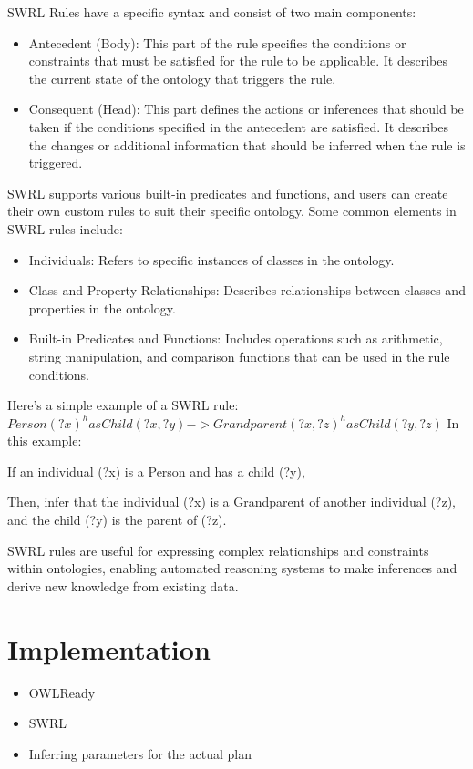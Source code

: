 \documentclass[	pdftex, 
								a4paper,
								11pt, DIV11, BCOR5mm,
								parskip,
								]{scrreprt}
\begin{document}
	SWRL Rules have a specific syntax and consist of two main components:
	\begin{itemize}
		\item Antecedent (Body): This part of the rule specifies the conditions or constraints that must be satisfied for the rule to be applicable. It describes the current state of the ontology that triggers the rule.
		\item Consequent (Head): This part defines the actions or inferences that should be taken if the conditions specified in the antecedent are satisfied. It describes the changes or additional information that should be inferred when the rule is triggered.
	\end{itemize}
	SWRL supports various built-in predicates and functions, and users can create their own custom rules to suit their specific ontology. Some common elements in SWRL rules include:
	\begin{itemize}
		\item Individuals: Refers to specific instances of classes in the ontology.
		\item Class and Property Relationships: Describes relationships between classes and properties in the ontology.
		\item Built-in Predicates and Functions: Includes operations such as arithmetic, string manipulation, and comparison functions that can be used in the rule conditions.
	\end{itemize}
	Here's a simple example of a SWRL rule:
	\newline
	$Person(?x) ^ hasChild(?x, ?y) -> Grandparent(?x, ?z) ^ hasChild(?y, ?z)$
	\newline
	In this example:

	If an individual (?x) is a Person and has a child (?y),
	
	Then, infer that the individual (?x) is a Grandparent of another individual (?z), and the child (?y) is the parent of (?z).
	
	SWRL rules are useful for expressing complex relationships and constraints within ontologies, enabling automated reasoning systems to make inferences and derive new knowledge from existing data.









	\chapter*{Implementation}
	\begin{itemize}
		\item OWLReady
		\item SWRL
		\item Inferring parameters for the actual plan
	\end{itemize}
	
\end{document}
